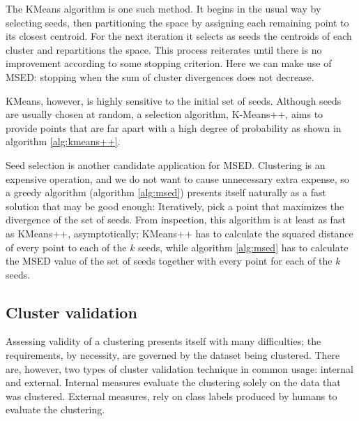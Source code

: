 The KMeans algorithm is one such method.  It begins in the usual way by selecting seeds, then partitioning the space by assigning each remaining point to its closest centroid.  For the next iteration it selects as seeds the centroids of each cluster and repartitions the space.  This process reiterates until there is no improvement according to some stopping criterion.  Here we can make use of MSED: stopping when the sum of cluster divergences does not decrease.

KMeans, however, is highly sensitive to the initial set of seeds\cite{Arthur:2007}.  Although seeds are usually chosen at random, a selection algorithm, K-Means++, aims to provide points that are far apart with a high degree of probability as shown in algorithm \ref{alg:kmeans++}.

Seed selection is another candidate application for MSED.  Clustering is an expensive operation, and we do not want to cause unnecessary extra expense, so a greedy algorithm (algorithm \ref{alg:msed}) presents itself naturally as a fast solution that may be good enough:
Iteratively, pick a point that maximizes the divergence of the set of seeds.  From inspection, this algorithm is at least as fast as KMeans++, asymptotically; KMeans++ has to calculate the squared distance of every point to each of the $k$ seeds, while algorithm \ref{alg:msed} has to calculate the MSED value of the set of seeds together with every point for each of the $k$ seeds.
\subsection{Cluster validation}
Assessing validity of a clustering presents itself with many difficulties; the requirements, by necessity, are governed by the dataset being clustered. There are, however, two types of cluster validation technique in common usage: internal and external.  Internal measures evaluate the clustering solely on the data that was clustered.  External measures, rely on class labels produced by humans to evaluate the clustering.  

